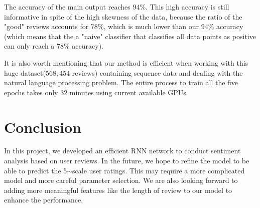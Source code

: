 \documentclass[letterpaper]{article} %
\begin{document}
The accuracy of the main output reaches $94\%$.  This high accuracy is still informative in spite of the high skewness of the data, because the ratio of the "good" reviews accounts for $78\%$, which is much lower than our $94\%$ accuracy (which means that the a "naive" classifier that classifies all data points as positive can only reach a $78\%$ accuracy).

It is also worth mentioning that our method is efficient when working with this huge dataset($568,454$ reviews) containing sequence data and dealing with the natural language processing problem. The entire process to train all the five epochs takes only 32 minutes using current available GPUs.   

\section{Conclusion}
In this project, we developed an efficient RNN network to conduct sentiment analysis based on user reviews. In the future, we hope to refine the model to be able to predict the 5$\sim$scale user ratings. This may require a more complicated model and more careful parameter selection. We are also looking forward to adding more meaningful features like the length of review to our model to enhance the performance. 
\end{document}

